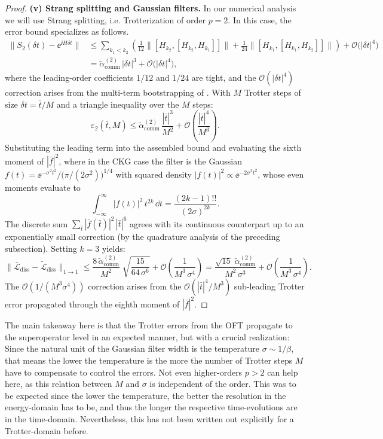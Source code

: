 \begin{proof}
    \medskip
    \noindent\textbf{(v) Strang splitting and Gaussian filters.} In our numerical analysis we will use Strang splitting, i.e. Trotterization of order $p = 2$. In this case, the error bound specializes as follows.
    \begin{align*}
    \bigl\|S_2(\delta t) - \ee^{\ii H \delta t}\bigr\|
    &\leq \sum_{k_1 < k_2}
    \left(
      \frac{1}{12}\bigl\|[H_{k_2},[H_{k_2},H_{k_1}]]\bigr\|
    + \frac{1}{24}\bigl\|[H_{k_1},[H_{k_1},H_{k_2}]]\bigr\|
    \right)
    + \mathcal{O}\bigl(|\delta t|^4\bigr) \\
    &= \tilde{\alpha}_{\mathrm{comm}}^{(2)}\,|\delta t|^3
    + \mathcal{O}\bigl(|\delta t|^4\bigr),
    \end{align*}
    where the leading-order coefficients $1/12$ and $1/24$ are tight, and the $\mathcal{O}(|\delta t|^4)$ correction arises from the multi-term bootstrapping of \cite[Proposition~9]{childs2021theory}.
    With $M$ Trotter steps of size $\delta t = \bar{t}/M$ and a triangle inequality
    over the $M$ steps:
    $$
    \varepsilon_2(\bar{t}, M)
    \leq \tilde{\alpha}_{\mathrm{comm}}^{(2)}\,
        \frac{|\bar{t}|^3}{M^2}
    + \mathcal{O}\!\left(\frac{|\bar{t}|^4}{M^3}\right).
    $$
    Substituting the leading term into the assembled bound and evaluating the sixth moment of $|\bar{f}|^2$, where in the CKG case the filter is the Gaussian $f(t) = \ee^{-\sigma^2 t^2}\big/\bigl(\pi/(2\sigma^2)\bigr)^{1/4}$ with squared density $|f(t)|^2 \propto \ee^{-2\sigma^2 t^2}$, whose even moments evaluate to
    $$
    \int_{-\infty}^{\infty} |f(t)|^2\,t^{2k}\,\dd t
    = \frac{(2k-1)!!}{(2\sigma)^{2k}}.
    $$
    The discrete sum $\sum_{\bar{t}} |\bar{f}(\bar{t})|^2\,|\bar{t}|^6$
    agrees with its continuous counterpart up to an exponentially small
    correction (by the quadrature analysis of the preceding subsection).
    Setting $k = 3$ yields:
    $$
    \bigl\|\bar{\mathcal{L}}_{\mathrm{diss}}
        - \tilde{\mathcal{L}}_{\mathrm{diss}}\bigr\|_{1 \to 1}
    \leq \frac{8\,\tilde{\alpha}_{\mathrm{comm}}^{(2)}}{M^2}\;
        \sqrt{\frac{15}{64\,\sigma^6}}
    + \mathcal{O}\!\left(\frac{1}{M^3\,\sigma^4}\right)
    = \frac{\sqrt{15}\;\tilde{\alpha}_{\mathrm{comm}}^{(2)}}
        {M^2\,\sigma^3}
    + \mathcal{O}\!\left(\frac{1}{M^3\,\sigma^4}\right).
    $$
    The $\mathcal{O}(1/(M^3\sigma^4))$ correction arises from the $\mathcal{O}(|\bar{t}|^4/M^3)$ sub-leading Trotter error propagated through the eighth moment of $|\bar{f}|^2$.
\end{proof}
\noindent The main takeaway here is that the Trotter errors from the OFT propagate to the superoperator level in an expected manner, but with a crucial realization: Since the natural unit of the Gaussian filter width is the temperature $\sigma \sim 1 / \beta$, that means the lower the temperature is the more the  number of Trotter steps $M$ have to compensate to control the errors. Not even higher-orders $ p>2$ can help here, as this relation between $M$ and $\sigma$ is independent of the order. This was to be expected since the lower the temperature, the better the resolution in the energy-domain has to be, and thus the longer the respective time-evolutions are in the time-domain. Nevertheless, this has not been written out explicitly for a Trotter-domain before. 

